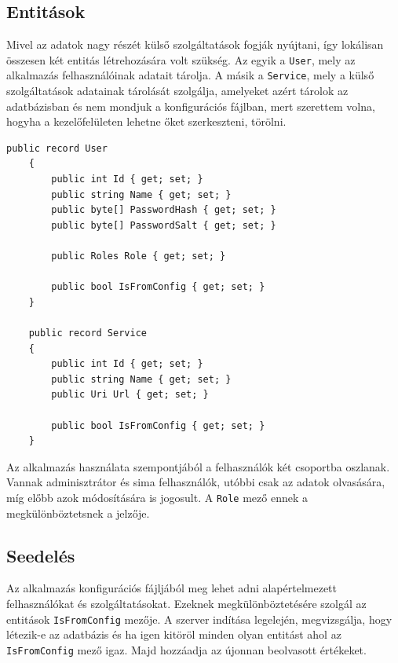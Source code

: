 \subsection{Entitások}
Mivel az adatok nagy részét külső szolgáltatások fogják nyújtani, így lokálisan összesen két entitás létrehozására volt szükség. 
Az egyik a \verb+User+, mely az alkalmazás felhasználóinak adatait tárolja. 
A másik a \verb+Service+, mely a külső szolgáltatások adatainak tárolását szolgálja, amelyeket azért tárolok az adatbázisban és nem mondjuk a konfigurációs fájlban,
mert szerettem volna, hogyha a kezelőfelületen lehetne őket szerkeszteni, törölni.

\begin{lstlisting}[style=csharp, caption=A User és a Service modell]
    public record User
    {
        public int Id { get; set; }
        public string Name { get; set; }
        public byte[] PasswordHash { get; set; }
        public byte[] PasswordSalt { get; set; }

        public Roles Role { get; set; }

        public bool IsFromConfig { get; set; }
    }

    public record Service
    {
        public int Id { get; set; }
        public string Name { get; set; }
        public Uri Url { get; set; }

        public bool IsFromConfig { get; set; }
    }
\end{lstlisting}

Az alkalmazás használata szempontjából a felhasználók két csoportba oszlanak.
Vannak adminisztrátor és sima felhasználók, utóbbi csak az adatok olvasására, míg előbb azok módosítására is jogosult.
A \verb+Role+ mező ennek a megkülönböztetsnek a jelzője.

\subsection{Seedelés}
\label{subsect:seeding}
Az alkalmazás konfigurációs fájljából meg lehet adni alapértelmezett felhasználókat és szolgáltatásokat.
Ezeknek megkülönböztetésére szolgál az entitások \verb+IsFromConfig+ mezője.
A szerver indítása legelején, megvizsgálja, hogy létezik-e az adatbázis és ha igen kitöröl minden olyan entitást ahol az \verb+IsFromConfig+ mező igaz.
Majd hozzáadja az újonnan beolvasott értékeket.

